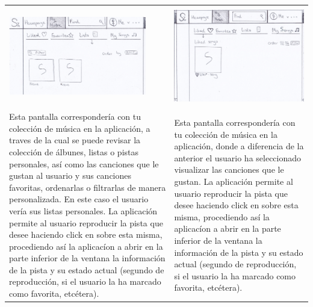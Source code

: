 \begin{tabular}{ p{6cm} p{6cm}}
	\hline
	\\
	\includegraphics[width=6cm]{Figures/web/Main-web.png}
	&
	\includegraphics[width=6cm]{Figures/web/Reproduction-web.png} \\
	\hline
	\\
	Esta pantalla correspondería con tu colección de música en la aplicación, a traves de la cual se puede revisar la colección de álbunes, listas o pistas personales, así como las canciones que le gustan al usuario y sus canciones favoritas, ordenarlas o filtrarlas de manera personalizada.
	En este caso el usuario vería sus listas personales.
	La aplicación permite al usuario reproducir la pista que desee haciendo click en sobre esta misma, procediendo así la aplicacíon a abrir en la parte inferior de la ventana la información de la pista y su estado actual (segundo de reproducción, si el usuario la ha marcado como favorita, etcétera).
	&
	Esta pantalla correspondería con tu colección de música en la aplicación, donde a diferencia  de la anterior el usuario ha seleccionado visualizar las canciones que le gustan.
	La aplicación permite al usuario reproducir la pista que desee haciendo click en sobre esta misma, procediendo así la aplicacíon a abrir en la parte inferior de la ventana la información de la pista y su estado actual (segundo de reproducción, si el usuario la ha marcado como favorita, etcétera).
	\\
	\hline
\end{tabular}

